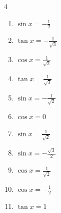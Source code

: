 \begin{multicols}{4}
\begin{enumerate}
  \item $\displaystyle \sin{x}  = -\frac{1}{2}$


  \item $\displaystyle \tan{x}  = -\frac{1}{\sqrt{3}}$


  \item $\displaystyle \cos{x}  = \frac{1}{\sqrt{2}}$


  \item $\displaystyle \tan{x}  = \frac{1}{\sqrt{3}}$


  \item $\displaystyle \sin{x}  = -\frac{1}{\sqrt{2}}$


  \item $\displaystyle \cos{x}  = 0$


  \item $\displaystyle \sin{x}  = \frac{1}{\sqrt{2}}$


  \item $\displaystyle \sin{x}  = -\frac{\sqrt{3}}{2}$


  \item $\displaystyle \cos{x}  = \frac{1}{\sqrt{2}}$


  \item $\displaystyle \cos{x}  = -\frac{1}{2}$


  \item $\displaystyle \tan{x}  = 1$



\end{enumerate}
\end{multicols}
